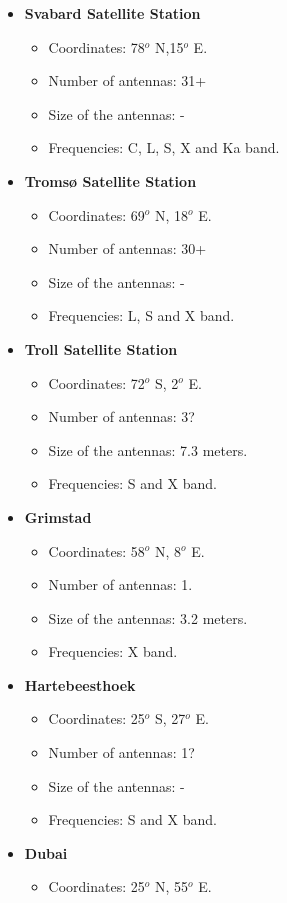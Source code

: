 \documentclass[12pt,a4paper]{report}
\begin{document}
\begin{itemize}
\item \textbf{Svabard Satellite Station}
\begin{itemize}
\item Coordinates: 78$^{o}$ N,15$^{o}$ E.
\item Number of antennas: 31+
\item Size of the antennas: -
\item Frequencies: C, L, S, X and Ka band.
\end{itemize}
\item \textbf{Tromsø Satellite Station}
\begin{itemize}
\item Coordinates: 69$^{o}$ N, 18$^{o}$ E.
\item Number of antennas: 30+
\item Size of the antennas: -
\item Frequencies: L, S and X band.
\end{itemize}
\item \textbf{Troll Satellite Station}
\begin{itemize}
\item Coordinates: 72$^{o}$ S, 2$^{o}$ E.
\item Number of antennas: 3?
\item Size of the antennas: 7.3 meters.
\item Frequencies: S and X band.
\end{itemize}
\item \textbf{Grimstad}
\begin{itemize}
\item Coordinates: 58$^{o}$ N, 8$^{o}$ E.
\item Number of antennas: 1.
\item Size of the antennas: 3.2 meters.
\item Frequencies: X band.
\end{itemize}
\item \textbf{Hartebeesthoek}
\begin{itemize}
\item Coordinates: 25$^{o}$ S, 27$^{o}$ E.
\item Number of antennas: 1?
\item Size of the antennas: -
\item Frequencies: S and X band.
\end{itemize}
\item \textbf{Dubai}
\begin{itemize}
\item Coordinates: 25$^{o}$ N, 55$^{o}$ E.

\end{itemize}
\end{itemize}
\end{document}
